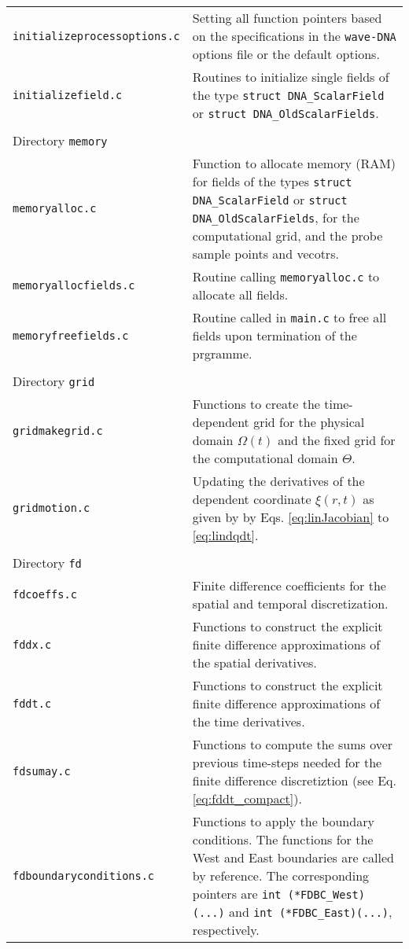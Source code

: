 \begin{longtable}{p{} p{}}
{\tt initializeprocessoptions.c} & Setting all function pointers based on the specifications in the {\tt wave-DNA} options file or the default options. \\
{\tt initializefield.c} & Routines to initialize single fields of the type {\tt struct DNA\_ScalarField} or {\tt struct DNA\_OldScalarFields}. \\
\\
\hline Directory {\tt memory} &\\ \hline
{\tt memoryalloc.c} & Function to allocate memory (RAM) for fields of the types {\tt struct DNA\_ScalarField} or {\tt struct DNA\_OldScalarFields}, for the computational grid, and the probe sample points and vecotrs. \\
{\tt memoryallocfields.c} & Routine calling {\tt memoryalloc.c} to allocate all fields. \\
{\tt memoryfreefields.c} & Routine called in {\tt main.c} to free all fields upon termination of the prgramme. \\
\\
\hline Directory {\tt grid} &\\ \hline
{\tt gridmakegrid.c} & Functions to create the time-dependent grid for the physical domain $\Omega\left(t\right)$ and the fixed grid for the computational domain $\Theta$. \\
{\tt gridmotion.c} & Updating the derivatives of the dependent coordinate $\xi\left(r,t\right)$ as given by by Eqs. \eqref{eq:linJacobian} to \eqref{eq:lindqdt}. \\
\\
\hline Directory {\tt fd} &\\ \hline
{\tt fdcoeffs.c} & Finite difference coefficients for the spatial and temporal discretization. \\
{\tt fddx.c} & Functions to construct the explicit finite difference approximations of the spatial derivatives.  \\
{\tt fddt.c} & Functions to construct the explicit finite difference approximations of the time derivatives. \\
{\tt fdsumay.c} & Functions to compute the sums over previous time-steps needed for the finite difference discretiztion (see Eq. \eqref{eq:fddt_compact}). \\
{\tt fdboundaryconditions.c} & Functions to apply the boundary conditions. The functions for the West and East boundaries are called by reference. The corresponding pointers are {\tt int (*FDBC\_West)(...)} and {\tt int (*FDBC\_East)(...)}, respectively.  \\

\end{longtable}
